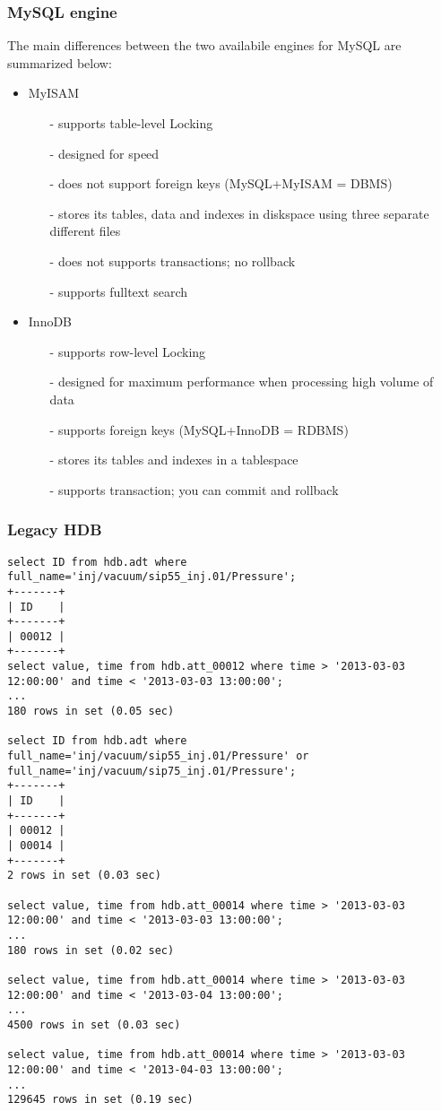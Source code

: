 \documentclass[11pt,a4paper]{article}
\begin{document}
\subsubsection{MySQL engine}
The main differences between the two availabile engines for MySQL
are summarized below:
\begin{itemize}
	\item MyISAM
	\begin{itemize}
		\item[-] supports table-level Locking
		\item[-] designed for speed
		\item[-] does not support foreign keys (MySQL+MyISAM = DBMS)
		\item[-] stores its tables, data and indexes in diskspace using
						 three separate different files
		\item[-] does not supports transactions; no rollback
		\item[-] supports fulltext search
	\end{itemize}
	\item InnoDB
	\begin{itemize}
		\item[-] supports row-level Locking
		\item[-] designed for maximum performance when processing high
						 volume of data
		\item[-] supports foreign keys (MySQL+InnoDB = RDBMS)
		\item[-] stores its tables and indexes in a tablespace
		\item[-] supports transaction; you can commit and rollback
	\end{itemize}
\end{itemize}


\subsubsection{Legacy HDB}
\begin{lstlisting}
select ID from hdb.adt where full_name='inj/vacuum/sip55_inj.01/Pressure';
+-------+
| ID    |
+-------+
| 00012 |
+-------+
select value, time from hdb.att_00012 where time > '2013-03-03 12:00:00' and time < '2013-03-03 13:00:00';
...
180 rows in set (0.05 sec)

select ID from hdb.adt where full_name='inj/vacuum/sip55_inj.01/Pressure' or full_name='inj/vacuum/sip75_inj.01/Pressure';
+-------+
| ID    |
+-------+
| 00012 |
| 00014 |
+-------+
2 rows in set (0.03 sec)

select value, time from hdb.att_00014 where time > '2013-03-03 12:00:00' and time < '2013-03-03 13:00:00';
...
180 rows in set (0.02 sec)

select value, time from hdb.att_00014 where time > '2013-03-03 12:00:00' and time < '2013-03-04 13:00:00';
...
4500 rows in set (0.03 sec)

select value, time from hdb.att_00014 where time > '2013-03-03 12:00:00' and time < '2013-04-03 13:00:00';
...
129645 rows in set (0.19 sec)
\end{lstlisting}
\end{document}
